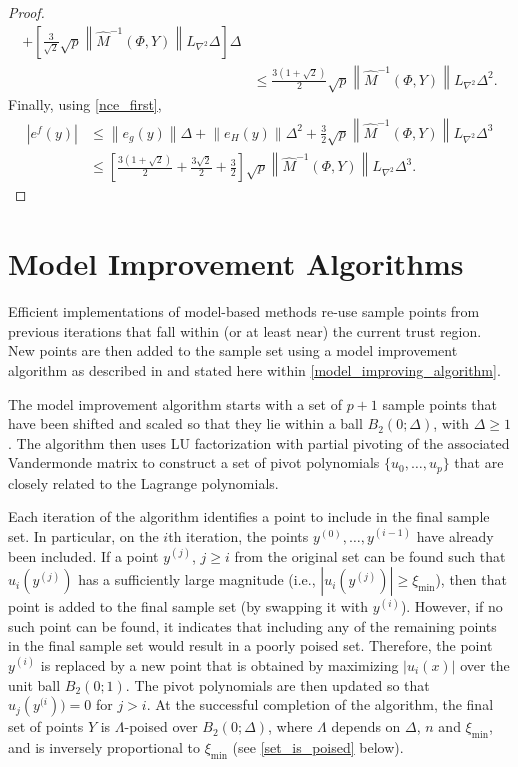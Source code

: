 \begin{proof}
\begin{align*}
+ \left[\frac 3 {\sqrt 2} \sqrt{p} \left\|\hat M^{-1}(\Phi, Y) \right\| L_{\nabla^2} \Delta\right]
\Delta \\
&\le\frac {3\left(1 + \sqrt 2\right)} {2} \sqrt{p} \left\|\hat M^{-1}(\Phi, Y) \right\| L_{\nabla^2} \Delta^2.
\end{align*}
Finally, using \cref{nce_first},
\begin{align*}
\left|e^f\left(y\right)\right| &\le \left\|e_g(y)\right\| \Delta + \left\|e_H(y)\right\|\Delta^2
+ \frac 3 2 \sqrt{p} \left\|\hat M^{-1}(\Phi, Y) \right\| L_{\nabla^2} \Delta^3 \\
&\le\left[\frac {3\left(1 + \sqrt 2\right)} {2} +\frac {3 \sqrt{2}}2 + \frac 3 2\right]\sqrt{p} \left\|\hat M^{-1}(\Phi, Y) \right\| L_{\nabla^2} \Delta^3.
\end{align*}
\end{proof}

\section{Model Improvement Algorithms}

\label{model_improvement_algorithms}
Efficient implementations of model-based methods re-use sample points from previous iterations that fall within (or at least near) the current trust region.
New points are then added to the sample set using a model improvement algorithm as described in 
\cite{introduction_book} and stated here within \cref{model_improving_algorithm}.

The model improvement algorithm starts with a set of $p+1$ sample points that have been shifted and scaled so that they lie within a ball $B_2(0;\Delta)$, with $\Delta \ge 1$.   
The algorithm then uses LU factorization with partial pivoting of the 
associated Vandermonde matrix to construct a set of pivot polynomials $\{u_0, \ldots, u_p\}$ that are closely related to the Lagrange polynomials. 


Each iteration of the algorithm identifies a point to include in the final sample set.
In particular, on the $i$th iteration, the points $y^{(0)}, \ldots, y^{(i-1)}$ have already been included.   
If a point $y^{(j)}$,  $j \ge i$ from the original set can be found such that 
$u_i(y^{(j)})$ has a sufficiently large magnitude  (i.e.,  $|u_i(y^{(j)})| \ge \xi_{\min}$),  
then that point is added to the final sample set (by swapping it with $y^{(i)}$).
However, if no such point can be found, 
it indicates that including any of the remaining points in the final sample set would result in a poorly poised set.
Therefore, the point $y^{(i)}$ is replaced by a new point that is obtained by maximizing $|u_i(x)|$ 
over the unit ball $B_2(0;1)$.
The pivot polynomials are then updated so that 
$u_j(y^{(i})) = 0$ for $j > i$.
At the successful completion of the algorithm, the final set of points $Y$ is $\Lambda$-poised over $B_2(0;\Delta)$,
where $\Lambda$ depends on $\Delta$,  $n$ and $\xi_{\min}$,  and is inversely proportional to $\xi_{\min}$
(see \cref{set_is_poised} below).

